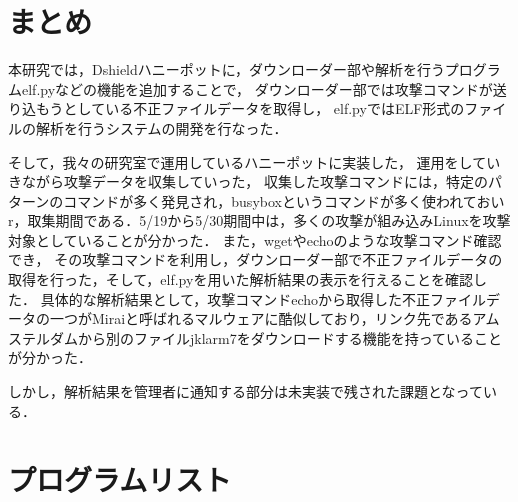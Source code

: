 \documentclass[dvipdfmx]{bta}
\begin{document}

\chapter{まとめ}

本研究では，Dshieldハニーポットに，ダウンローダー部や解析を行うプログラムelf.pyなどの機能を追加することで，
ダウンローダー部では攻撃コマンドが送り込もうとしている不正ファイルデータを取得し，
elf.pyではELF形式のファイルの解析を行うシステムの開発を行なった．

そして，我々の研究室で運用しているハニーポットに実装した，
運用をしていきながら攻撃データを収集していった，
収集した攻撃コマンドには，特定のパターンのコマンドが多く発見され，busyboxというコマンドが多く使われておいr，取集期間である．5/19から5/30期間中は，多くの攻撃が組み込みLinuxを攻撃対象としていることが分かった．
また，wgetやechoのような攻撃コマンド確認でき，
その攻撃コマンドを利用し，ダウンローダー部で不正ファイルデータの取得を行った，そして，elf.pyを用いた解析結果の表示を行えることを確認した．
具体的な解析結果として，攻撃コマンドechoから取得した不正ファイルデータの一つがMiraiと呼ばれるマルウェアに酷似しており，リンク先であるアムステルダムから別のファイルjklarm7をダウンロードする機能を持っていることが分かった．

しかし，解析結果を管理者に通知する部分は未実装で残された課題となっている．

%



\appendix

\chapter{プログラムリスト}


\end{document}

